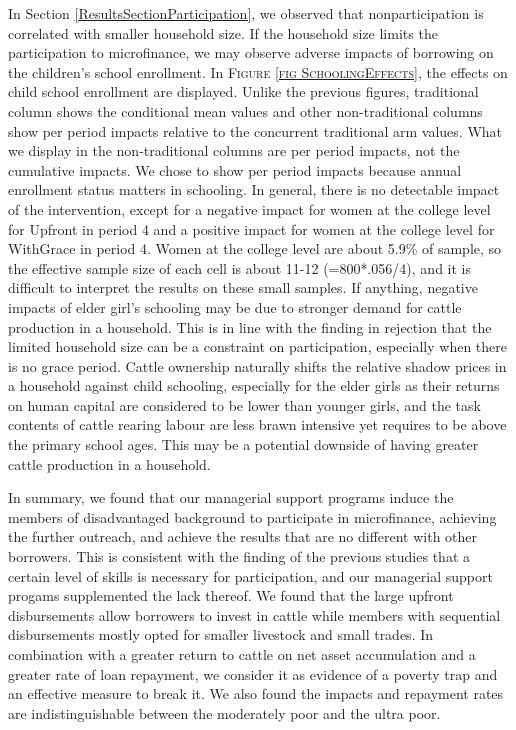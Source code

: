 	In Section \ref{ResultsSectionParticipation}, we observed that nonparticipation is correlated with smaller household size. If the household size limits the participation to microfinance, we may observe adverse impacts of borrowing on the children's school enrollment. In \textsc{\footnotesize Figure \ref{fig SchoolingEffects}}, the effects on child school enrollment are displayed. Unlike the previous figures, \textsf{traditional} column shows the conditional mean values and other non-\textsf{traditional} columns show per period impacts relative to the concurrent \textsf{traditional} arm values. What we display in the non-\textsf{traditional} columns are per period impacts, not the cumulative impacts. We chose to show per period impacts because annual enrollment status matters in schooling. In general, there is no detectable impact of the intervention, except for a negative impact for women at the college level for \textsf{Upfront} in period 4 and a positive impact for women at the college level for \textsf{WithGrace} in period 4. Women at the college level are about 5.9\% of sample, so the effective sample size of each cell is about 11-12 (=800*.056/4), and it is difficult to interpret the results on these small samples. If anything, negative impacts of elder girl's schooling may be due to stronger demand for cattle production in a household. This is in line with the finding in rejection that the limited household size can be a constraint on participation, especially when there is no grace period. Cattle ownership naturally shifts the relative shadow prices in a household against child schooling, especially for the elder girls as their returns on human capital are considered to be lower than younger girls, and the task contents of cattle rearing labour are less brawn intensive yet requires to be above the primary school ages. This may be a potential downside of having greater cattle production in a household.

	In summary, we found that our managerial support programs induce the members of disadvantaged background to participate in microfinance, achieving the further outreach, and achieve the results that are no different with other borrowers. This is consistent with the finding of the previous studies that a certain level of skills is necessary for participation, and our managerial support progams supplemented the lack thereof. 	We found that the large upfront disbursements allow borrowers to invest in cattle while members with sequential disbursements mostly opted for smaller livestock and small trades. In combination with a greater return to cattle on net asset accumulation and a greater rate of loan repayment, we consider it as evidence of a poverty trap and an effective measure to break it. We also found the impacts and repayment rates are indistinguishable between the moderately poor and the ultra poor.




